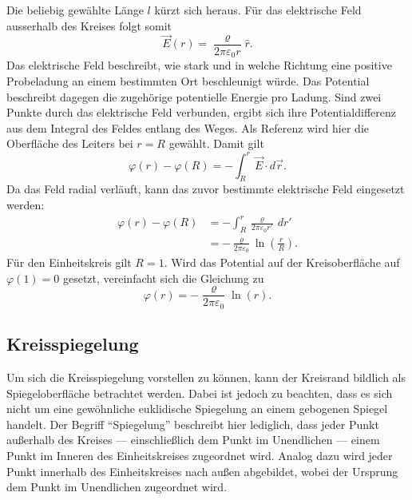 Die beliebig gewählte Länge $l$ kürzt sich heraus. Für das elektrische Feld ausserhalb des Kreises folgt somit
\begin{equation}
    \vec{E}(r)
    =
    \frac{\varrho}{2\pi\varepsilon_0 r}\hat{r}.
    \label{elektro:equation:efeld_radial}
\end{equation}
Das elektrische Feld beschreibt, wie stark und in welche Richtung eine positive Probeladung an einem bestimmten Ort beschleunigt würde.
Das Potential beschreibt dagegen die zugehörige potentielle Energie pro Ladung.
Sind zwei Punkte durch das elektrische Feld verbunden, ergibt sich ihre Potentialdifferenz aus dem Integral des Feldes entlang des Weges.
Als Referenz wird hier die Oberfläche des Leiters bei $r=R$ gewählt.
Damit gilt
\begin{equation*}
    \varphi(r)-\varphi(R)
    =
    -\int_R^r \vec{E}\cdot d\vec{r}.
\end{equation*}
Da das Feld radial verläuft, kann das zuvor bestimmte elektrische Feld eingesetzt werden:
\begin{align*}
    \varphi(r)-\varphi(R)
    &=
    -\int_R^r
    \frac{\varrho}{2\pi\varepsilon_0 r'}\,dr'
    \\
    &=
    -\frac{\varrho}{2\pi\varepsilon_0}
    \ln\left(\frac{r}{R}\right).
\end{align*}
Für den Einheitskreis gilt $R=1$.
Wird das Potential auf der Kreisoberfläche auf $\varphi(1)=0$ gesetzt, vereinfacht sich die Gleichung zu
\begin{equation}
    \varphi(r)
    =
    -\frac{\varrho}{2\pi\varepsilon_0}\ln(r).
    \label{elektro:equation:potential_radial}
\end{equation}



\subsection{Kreisspiegelung
\label{elektro:subsection:Kreisspiegelung}}

Um sich die Kreisspiegelung vorstellen zu können, kann der Kreisrand bildlich als Spiegeloberfläche betrachtet werden. Dabei ist jedoch zu beachten, dass es sich nicht um eine gewöhnliche euklidische Spiegelung an einem gebogenen Spiegel handelt. 
Der Begriff ``Spiegelung'' beschreibt hier lediglich, dass jeder Punkt außerhalb des Kreises --- einschließlich dem Punkt im Unendlichen --- einem Punkt im Inneren des Einheitskreises zugeordnet wird. 
Analog dazu wird jeder Punkt innerhalb des Einheitskreises nach außen abgebildet, wobei der Ursprung dem Punkt im Unendlichen zugeordnet wird.

